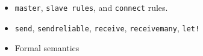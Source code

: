 \begin{itemize}[noitemsep]
	\item \texttt{master}, \texttt{slave rules}, and \texttt{connect} rules.
	\item \texttt{send}, \texttt{send\textunderscore reliable}, \texttt{receive}, \texttt{receive\textunderscore many}, \texttt{let!}
	\item Formal semantics
\end{itemize}